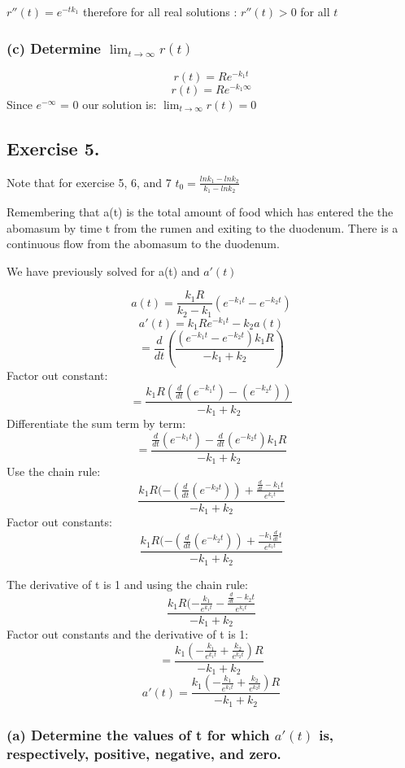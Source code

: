 \documentclass[]{article}
\begin{document}
\(r''(t) = e^{-t k_1}\) therefore for all real solutions :
\(r''(t) > 0\) for all \(t\)

\subsubsection{\texorpdfstring{(c) Determine
\(\lim_{t\to\infty}r(t)\)}{(c) Determine \textbackslash{}lim\_\{t\textbackslash{}to\textbackslash{}infty\}r(t)}}\label{c-determine-lim_ttoinftyrt}

\[r(t) = Re^{-k_1t}\] \[r(t) = Re^{-k_1 \infty}\] Since \(e^{-\infty}\)
= 0 our solution is: \(\lim_{t\to\infty}r(t) =0\)

\subsection{Exercise 5.}\label{exercise-5.}

Note that for exercise 5, 6, and 7
\(t_0 = \frac{ln k_1 - ln k_2}{k_1 - lnk_2}\)

Remembering that a(t) is the total amount of food which has entered the
the abomasum by time t from the rumen and exiting to the duodenum. There
is a continuous flow from the abomasum to the duodenum.

We have previously solved for a(t) and \(a'(t)\)

\[a(t) = \frac{k_1 R}{k_2-k_1}(e^{-k_1t} - e^{-k_2t})\]
\[a'(t) = k_1Re^{-k_1t}-k_2a(t)\]
\[= \frac{d}{dt}(\frac{(e^{-k_1 t}- e^{-k_2 t})k_1 R}{-k_1 + k_2})\]
Factor out constant:
\[=\frac{k_1 R (\frac{d}{dt}(e^{-k_1 t})-(e^{-k_2 t}))}{-k_1 + k_2}\]
Differentiate the sum term by term:
\[=\frac{\frac{d}{dt}(e^{-k_1 t})- \frac{d}{dt}(e^{-k_2 t})k_1 R}{-k_1 + k_2}\]
Use the chain rule:
\[\frac{k_1 R (-(\frac{d}{dt}(e^{-k_2t}))+\frac{\frac{d}{dt}-k_1t}{e^{k_1t}}}{-k_1 +k_2}\]
Factor out constants:
\[\frac{k_1 R (-(\frac{d}{dt}(e^{-k_2t}))+\frac{-k_1\frac{d}{dt}t}{e^{k_1t}}}{-k_1 +k_2}\]

The derivative of t is 1 and using the chain rule:
\[\frac{k_1 R(-\frac{k_1}{e^{k_1 t}}-\frac{\frac{d}{dt}-k_2t}{e^{k_1t}}}{-k_1 +k_2}\]
Factor out constants and the derivative of t is 1:
\[= \frac{k_1 ( -\frac{k_1}{e^{k_1t}}+\frac{k_2}{e^{k_2t}})R}{-k_1 + k_2}\]
\[a'(t) = \frac{k_1 ( -\frac{k_1}{e^{k_1t}}+\frac{k_2}{e^{k_2t}})R}{-k_1 + k_2}\]

\subsubsection{\texorpdfstring{(a) Determine the values of t for which
\(a'(t)\) is, respectively, positive, negative, and
zero.}{(a) Determine the values of t for which a'(t) is, respectively, positive, negative, and zero.}}\label{a-determine-the-values-of-t-for-which-at-is-respectively-positive-negative-and-zero.}
\end{document}
